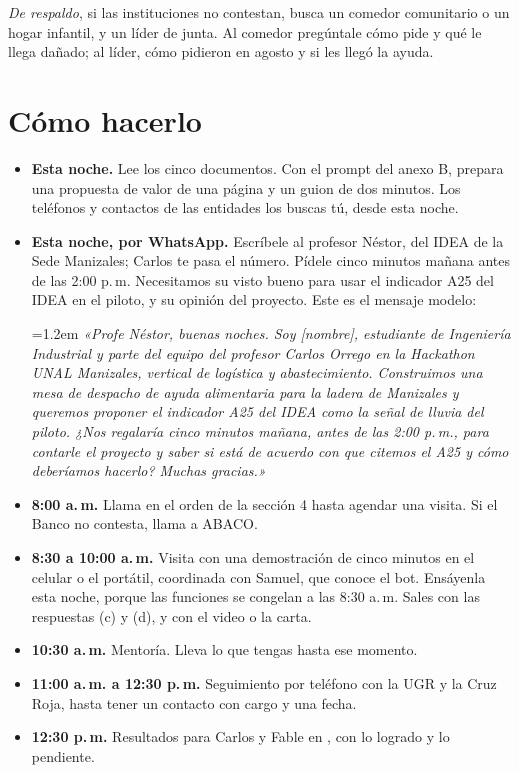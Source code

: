 \documentclass[11pt,letterpaper,parskip=half-]{scrartcl}
\begin{document}
\emph{De respaldo}, si las instituciones no contestan, busca un comedor comunitario o un hogar infantil, y un líder de junta. Al comedor pregúntale cómo pide y qué le llega dañado; al líder, cómo pidieron en agosto y si les llegó la ayuda.

\section{Cómo hacerlo}

\begin{itemize}[leftmargin=1.2em, itemsep=2pt]
\item \textbf{Esta noche.} Lee los cinco documentos. Con el prompt del anexo B, prepara una propuesta de valor de una página y un guion de dos minutos. Los teléfonos y contactos de las entidades los buscas tú, desde esta noche.
\item \textbf{Esta noche, por WhatsApp.} Escríbele al profesor Néstor, del IDEA de la Sede Manizales; Carlos te pasa el número. Pídele cinco minutos mañana antes de las 2:00 p.\,m. Necesitamos su visto bueno para usar el indicador A25 del IDEA en el piloto, y su opinión del proyecto. Este es el mensaje modelo:\par\smallskip
{\leftskip=1.2em\small\itshape
«Profe Néstor, buenas noches. Soy [nombre], estudiante de Ingeniería Industrial y parte del equipo del profesor Carlos Orrego en la Hackathon UNAL Manizales, vertical de logística y abastecimiento. Construimos una mesa de despacho de ayuda alimentaria para la ladera de Manizales y queremos proponer el indicador A25 del IDEA como la señal de lluvia del piloto. ¿Nos regalaría cinco minutos mañana, antes de las 2:00 p.\,m., para contarle el proyecto y saber si está de acuerdo con que citemos el A25 y cómo deberíamos hacerlo? Muchas gracias.»\par}
\item \textbf{8:00 a.\,m.} Llama en el orden de la sección 4 hasta agendar una visita. Si el Banco no contesta, llama a ABACO.
\item \textbf{8:30 a 10:00 a.\,m.} Visita con una demostración de cinco minutos en el celular o el portátil, coordinada con Samuel, que conoce el bot. Ensáyenla esta noche, porque las funciones se congelan a las 8:30 a.\,m. Sales con las respuestas (c) y (d), y con el video o la carta.
\item \textbf{10:30 a.\,m.} Mentoría. Lleva lo que tengas hasta ese momento.
\item \textbf{11:00 a.\,m. a 12:30 p.\,m.} Seguimiento por teléfono con la UGR y la Cruz Roja, hasta tener un contacto con cargo y una fecha.
\item \textbf{12:30 p.\,m.} Resultados para Carlos y Fable en , con lo logrado y lo pendiente.
\end{itemize}
\end{document}

